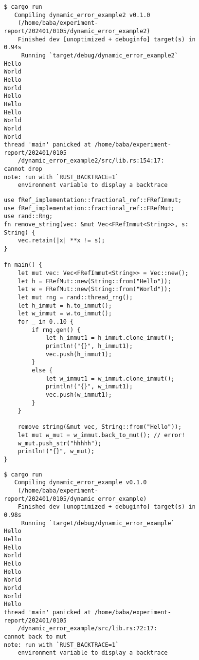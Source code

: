 \documentclass{sumiilab-paper}
\theoremstyle{mystyle}
\numberwithin{definition}{chapter} %
\begin{document}
\begin{figure}[p]
\begin{lstlisting}[caption=オブジェクトの解放し忘れのエラー, 
  label=error_result1, captionpos=b]
$ cargo run
   Compiling dynamic_error_example2 v0.1.0 
    (/home/baba/experiment-report/202401/0105/dynamic_error_example2)
    Finished dev [unoptimized + debuginfo] target(s) in 0.94s
     Running `target/debug/dynamic_error_example2`
Hello
World
Hello
World
Hello
Hello
Hello
World
World
World
thread 'main' panicked at /home/baba/experiment-report/202401/0105
    /dynamic_error_example2/src/lib.rs:154:17:
cannot drop
note: run with `RUST_BACKTRACE=1` 
    environment variable to display a backtrace
\end{lstlisting}
\end{figure}

\begin{figure}[p]
\begin{lstlisting}[caption=Mutableな参照へ戻せないことを検出する例, 
  label=error_example2, captionpos=b]
use fRef_implementation::fractional_ref::FRefImmut;
use fRef_implementation::fractional_ref::FRefMut;
use rand::Rng;
fn remove_string(vec: &mut Vec<FRefImmut<String>>, s: String) {
    vec.retain(|x| **x != s);
}

fn main() {
    let mut vec: Vec<FRefImmut<String>> = Vec::new();
    let h = FRefMut::new(String::from("Hello"));
    let w = FRefMut::new(String::from("World"));
    let mut rng = rand::thread_rng();
    let h_immut = h.to_immut();
    let w_immut = w.to_immut();
    for _ in 0..10 {
        if rng.gen() {
            let h_immut1 = h_immut.clone_immut();
            println!("{}", h_immut1);
            vec.push(h_immut1);
        }
        else {
            let w_immut1 = w_immut.clone_immut();
            println!("{}", w_immut1);
            vec.push(w_immut1);
        }
    }

    remove_string(&mut vec, String::from("Hello"));
    let mut w_mut = w_immut.back_to_mut(); // error!
    w_mut.push_str("hhhhh");
    println!("{}", w_mut);
}
\end{lstlisting}
\end{figure}
\begin{figure}[p]
\begin{lstlisting}[caption=Mutableな参照に戻し忘れた際のエラー, 
  label=error_result2, captionpos=b]
$ cargo run
   Compiling dynamic_error_example v0.1.0
    (/home/baba/experiment-report/202401/0105/dynamic_error_example)
    Finished dev [unoptimized + debuginfo] target(s) in 0.98s
     Running `target/debug/dynamic_error_example`
Hello
Hello
Hello
World
Hello
Hello
World
World
World
Hello
thread 'main' panicked at /home/baba/experiment-report/202401/0105
    /dynamic_error_example/src/lib.rs:72:17:
cannot back to mut
note: run with `RUST_BACKTRACE=1` 
    environment variable to display a backtrace
\end{lstlisting}
\end{figure}
\end{document}
